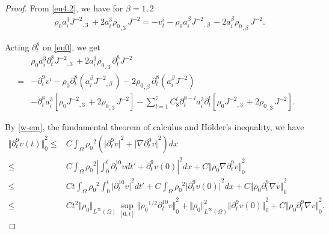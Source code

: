 \documentclass[12pt,twoside,reqno]{amsart}
\numberwithin{equation}{section}
\theoremstyle{definition}
\theoremstyle{remark}
\begin{document}
\begin{proof}
From \eqref{eu4.2}, we have for $\beta=1,2$
\begin{align}\label{eu0}
&{\rho_0} a_i^3 {{{J^{-2}}}_{,{3}}\,}+2 a_i^3{{\rho_0}_{,{3}}\,}J^{-2}
=-v_t^i-{\rho_0} a_i^\beta{{{J^{-2}}}_{,{\beta}}\,}-2  a_i^\beta{{\rho_0}_{,{\beta}}\,}J^{-2}.
\end{align}

Acting ${\partial}_t^8$ on \eqref{eu0}, we get
\begin{align*}
&{\rho_0}  a_i^3 {\partial}_t^8{{{J^{-2}}}_{,{3}}\,}+2 a_i^3{{\rho_0}_{,{3}}\,} {\partial}_t^8 J^{-2}\\
=&-{\partial}_t^9v^i-{\rho_0}  {\partial}_t^8(a_i^\beta{{{J^{-2}}}_{,{\beta}}\,})-2 {{\rho_0}_{,{\beta}}\,} {\partial}_t^8(a_i^\beta J^{-2})\\
&-{\partial}_t^8 a_i^3[ {\rho_0}  {{{J^{-2}}}_{,{3}}\,}+2 {{\rho_0}_{,{3}}\,}J^{-2}]-\sum_{l=1}^7 C_8^l{\partial}_t^{8-l} a_i^3{\partial}_t^l[ {\rho_0}  {{{J^{-2}}}_{,{3}}\,}+2 {{\rho_0}_{,{3}}\,}J^{-2}].
\end{align*}

By \eqref{w-em}, the fundamental theorem of calculus and H\"older's inequality, we have
\begin{align*}
{\Vert{{\partial}_t^9v(t)}\Vert}_0^2{\leqslant}& C\int_\Omega {\rho_0}^2 \left({\vert{{\partial}_t^9 v}\vert}^2+{\vert{{\nabla}{\partial}_t^9 v}\vert}^2\right)dx\\
  {\leqslant} &C\int_\Omega {\rho_0}^2 {\left\vert{\int_0^t {\partial}_t^{10} vdt'+{\partial}_t^9 v(0)}\right\vert}^2 dx+C{\Vert{{\rho_0} {\nabla}{\partial}_t^9v}\Vert}_0^2\\
  {\leqslant}& C t\int_\Omega {\rho_0}^2 \int_0^t {\vert{{\partial}_t^{10} v}\vert}^2 dt'+C\int_\Omega {\rho_0}^2 {\vert{{\partial}_t^9 v(0)}\vert}^2dx+C{\Vert{{\rho_0}  {\partial}_t^9{\nabla} v}\Vert}_0^2\\
  {\leqslant}&Ct^2{\Vert{\rho_0}\Vert}_{L^\infty(\Omega)}\sup_{[0,t]} {\Vert{{\rho_0}^{1/2}{\partial}_t^{10} v}\Vert}_0^2+{\Vert{\rho_0}\Vert}_{L^\infty(\Omega)}^{2}{\Vert{{\partial}_t^9 v(0)}\Vert}_0^2+C{\Vert{{\rho_0}  {\partial}_t^9{\nabla} v}\Vert}_0^2.
\end{align*}


\end{proof}
\end{document}

